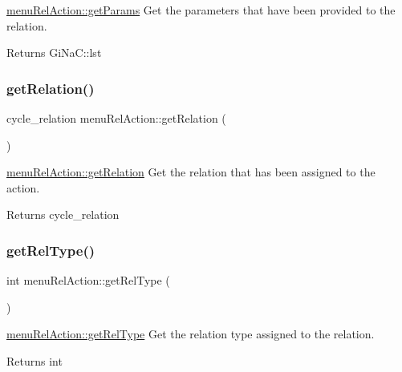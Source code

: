 \mbox{\hyperlink{classmenu_rel_action_a8da5cc4f4063d4ea465d67b0aabc57e7}{menu\+Rel\+Action\+::get\+Params}} Get the parameters that have been provided to the relation. 

\begin{DoxyReturn}{Returns}
Gi\+Na\+C\+::lst 
\end{DoxyReturn}
\mbox{\label{classmenu_rel_action_a34deae132c511b7e34af97585df9245c}} 
\subsubsection{\texorpdfstring{get\+Relation()}{getRelation()}}
{\footnotesize\ttfamily cycle\+\_\+relation menu\+Rel\+Action\+::get\+Relation (\begin{DoxyParamCaption}{ }\end{DoxyParamCaption})}



\mbox{\hyperlink{classmenu_rel_action_a34deae132c511b7e34af97585df9245c}{menu\+Rel\+Action\+::get\+Relation}} Get the relation that has been assigned to the action. 

\begin{DoxyReturn}{Returns}
cycle\+\_\+relation 
\end{DoxyReturn}
\mbox{\label{classmenu_rel_action_a1092ced0a224fdb4c8f5a0b12548a120}} 
\subsubsection{\texorpdfstring{get\+Rel\+Type()}{getRelType()}}
{\footnotesize\ttfamily int menu\+Rel\+Action\+::get\+Rel\+Type (\begin{DoxyParamCaption}{ }\end{DoxyParamCaption})}



\mbox{\hyperlink{classmenu_rel_action_a1092ced0a224fdb4c8f5a0b12548a120}{menu\+Rel\+Action\+::get\+Rel\+Type}} Get the relation type assigned to the relation. 

\begin{DoxyReturn}{Returns}
int 
\end{DoxyReturn}
\mbox{\label{classmenu_rel_action_a5e6339dbaf4cf0dc9543afdfc5b9e15a}} 
